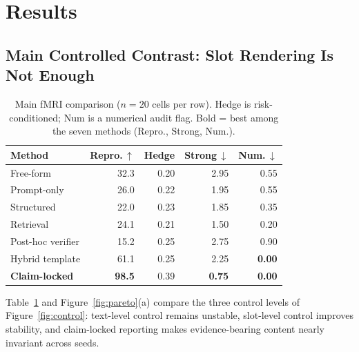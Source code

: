 \documentclass[10pt,twocolumn]{article}
\begin{document}
\section{Results}

\subsection{Main Controlled Contrast: Slot Rendering Is Not Enough}
\label{sec:main}

\begin{table}[t]
\caption{Main fMRI comparison ($n=20$ cells per row). Hedge is risk-conditioned; Num is a numerical audit flag. Bold = best among the seven methods (Repro., Strong, Num.).}
\label{tab:main}
\centering
\footnotesize
\setlength{\tabcolsep}{4pt}
\begin{tabular}{lrrrr}
\toprule
Method & Repro.\,$\uparrow$ & Hedge & Strong\,$\downarrow$ & Num.\,$\downarrow$ \\
\midrule
Free-form          & 32.3 & 0.20 & 2.95 & 0.55 \\
Prompt-only        & 26.0 & 0.22 & 1.95 & 0.55 \\
Structured         & 22.0 & 0.23 & 1.85 & 0.35 \\
Retrieval          & 24.1 & 0.21 & 1.50 & 0.20 \\
Post-hoc verifier  & 15.2 & 0.25 & 2.75 & 0.90 \\
Hybrid template    & 61.1 & 0.25 & 2.25 & \textbf{0.00} \\
\textbf{Claim-locked} & \textbf{98.5} & 0.39 & \textbf{0.75} & \textbf{0.00} \\
\bottomrule
\end{tabular}
\end{table}

Table~\ref{tab:main} and Figure~\ref{fig:pareto}(a) compare the three control levels of Figure~\ref{fig:control}: text-level control remains unstable, slot-level control improves stability, and claim-locked reporting makes evidence-bearing content nearly invariant across seeds.
\end{document}
